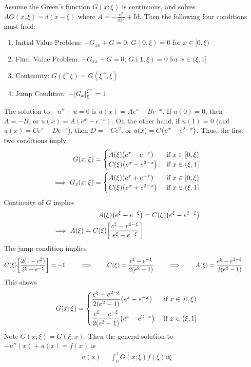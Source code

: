 \documentclass{article} %
\theoremstyle{plain}
\begin{document}
Assume the Green's function $G(x;\xi)$ is continuous, and solves $AG(x, \xi) = \delta(x - \xi)$ where $A = -\frac{\dd^2}{\dd x^2} + \text{Id}$.  Then the following four conditions must hold:
\begin{enumerate}
    \item Initial Value Problem: $-G_{xx} + G = 0$; $G(0, \xi) = 0$ for $x \in [0, \xi)$
    \item Final Value Problem: $-G_{xx} + G = 0$; $G(1, \xi) = 0$ for $x \in (\xi, 1]$
    \item Continuity: $G(\xi^- \xi) = G(\xi^+, \xi)$
    \item Jump Condition: $-\qty[G_x]_{\xi^-}^{\xi^+} = 1$
\end{enumerate}
The solution to $-u'' + u = 0$ is $u(x) = Ae^x + Be^{-x}$.  If $u(0) = 0$, then $A = -B$, or $u(x) = A(e^x - e^{-x})$.  On the other hand, if $u(1) = 0$ (and $u(x) = Ce^x + De^{-x}$), then $D = -Ce^2$, or $u(x) = C\qty(e^x - e^{2 - x})$.  Thus, the first two conditions imply
\begin{align*}
    G(x;\xi) &= \begin{cases}
        A(\xi)\qty(e^x - e^{-x}) & \text{ if } x \in [0, \xi) \\
        C(\xi)\qty(e^x - e^{2-x}) & \text{ if } x \in (\xi, 1]
    \end{cases} \\
    \implies G_x(x;\xi) &= \begin{cases}
        A(\xi)\qty(e^x + e^{-x}) & \text{ if } x \in [0, \xi) \\
        C(\xi)\qty(e^x + e^{2-x}) & \text{ if } x \in (\xi, 1]
    \end{cases}
\end{align*}
Continuity of $G$ implies
\begin{align*}
    A(\xi)\qty(e^\xi - e^{-\xi}) &= C(\xi)\qty(e^\xi - e^{2 - \xi}) \\
    \implies A(\xi) = C(\xi)\qty[\frac{e^\xi - e^{2 -\xi}}{e^\xi - e^{-\xi}}]
\end{align*}
The jump condition implies
\begin{align*}
    C(\xi)\qty[\frac{2(1 - e^2)}{2^\xi - e^{-\xi}}] &= -1 \qquad \implies \qquad C(\xi) = \frac{e^\xi - e^{-\xi}}{2(e^2 - 1)} \qquad \implies \qquad A(\xi) = \frac{e^\xi - e^{2-\xi}}{2(e^2 - 1)}
\end{align*}
This shows
\begin{align*}
    G(x;\xi) = \begin{cases}
        \dfrac{e^\xi - e^{2-\xi}}{2(e^2 - 1)}\qty(e^x - e^{-x}) & \text{ if } x \in [0, \xi) \\[.3cm]
        \dfrac{e^\xi - e^{-\xi}}{2(e^2 - 1)}\qty(e^x - e^{2-x}) & \text{ if } x \in (\xi, 1]
    \end{cases}
\end{align*}
Note $G(x;\xi) = G(\xi;x)$.  Then the general solution to $-u''(x) + u(x) = f(x)$ is
\begin{align*}
    u(x) = \int_0^1 G(x;\xi)f(\xi)\dd \xi
\end{align*}
\end{document}
